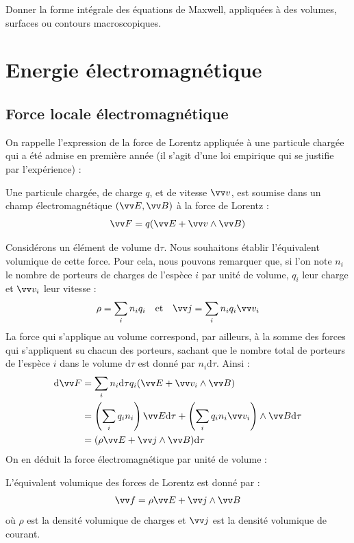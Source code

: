 \documentclass[11pt,fleqn]{book} %
\newcommand{\dd}{\mathrm{d}}
\begin{document}
\begin{capex}
	Donner la forme intégrale des équations de Maxwell, appliquées à des volumes, surfaces ou contours macroscopiques. 
\end{capex}

\section{Energie électromagnétique}

\subsection{Force locale électromagnétique}

On rappelle l'expression de la force de Lorentz appliquée à une particule chargée qui a été admise en première année (il s'agit d'une loi empirique qui se justifie par l'expérience) :
\begin{theorem}
	Une particule chargée, de charge $q$, et de vitesse $\vv v$, est soumise dans un champ électromagnétique $(\vv E, \vv B)$ à la force de Lorentz :
	\begin{equation}
		\vv F = q ( \vv E + \vv v \wedge \vv B)
	\end{equation}
\end{theorem}

Considérons un élément de volume $\dd \tau$. Nous souhaitons établir l'équivalent volumique de cette force. Pour cela, nous pouvons remarquer que, si l'on note $n_i$ le nombre de porteurs de charges de l'espèce $i$ par unité de volume, $q_i$ leur charge et $\vv v_i$ leur vitesse :
\begin{equation}
	\rho = \sum_i n_i q_i \quad \mathrm{et} \quad \vv j = \sum_i n_i q_i \vv v_i
\end{equation}
La force qui s'applique au volume correspond, par ailleurs, à la somme des forces qui s'appliquent su chacun des porteurs, sachant que le nombre total de porteurs de l'espèce $i$ dans le volume $\dd \tau$ est donné par $n_i \dd \tau$. Ainsi :
\begin{align}
	\dd \vv F &= \sum_i n_i \dd \tau q_i (\vv E + \vv v_i \wedge \vv B ) \\
	&= \left( \sum_i q_i n_i \right) \vv E \dd \tau  + \left( \sum_i q_i n_i \vv v_i \right) \wedge \vv B \dd \tau \\
	&= (\rho \vv E + \vv j \wedge \vv B) \dd \tau
\end{align}
On en déduit la force électromagnétique par unité de volume :
\begin{theorem}
	L'équivalent volumique des forces de Lorentz est donné par :
	\begin{equation}
		\vv f = \rho \vv E + \vv j \wedge \vv B
	\end{equation}
	où $\rho$ est la densité volumique de charges et $\vv j$ est la densité volumique de courant.
\end{theorem}
\end{document}
